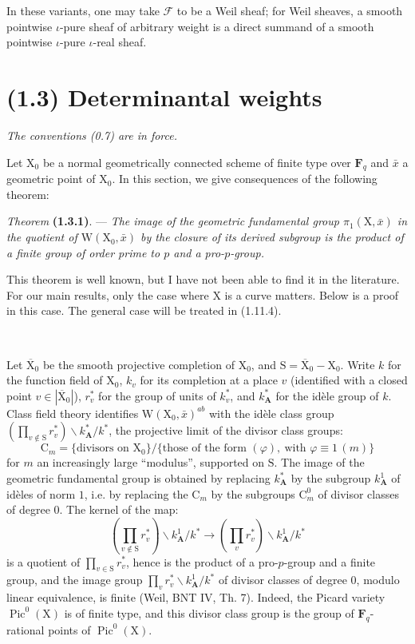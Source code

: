 \documentclass[11pt,leqno]{article}
\newcommand{\Page}[1]{\ifvmode\noindent\else\unskip\ \fi{\footnotesize\textcolor{gray}{[p.\,#1]}}\ \ignorespaces}
\begin{document}
In these variants, one may take \(\mathscr{F}\) to be a Weil sheaf; for Weil sheaves, a smooth pointwise \(\iota\)-pure sheaf of arbitrary weight is a direct summand of a smooth pointwise \(\iota\)-pure \(\iota\)-real sheaf.

\section*{(1.3) Determinantal weights}

\textit{The conventions \textup{(0.7)} are in force.}

Let \(\mathrm{X}_0\) be a normal geometrically connected scheme of finite type over \(\mathbf{F}_q\) and \(\bar{x}\) a geometric point of \(\mathrm{X}_0\). In this section, we give consequences of the following theorem:

\textit{Theorem} \textbf{(1.3.1)}. — \textit{The image of the geometric fundamental group \(\pi_1(\mathrm{X},\bar{x})\) in the quotient of \(\mathrm{W}(\mathrm{X}_0,\bar{x})\) by the closure of its derived subgroup is the product of a finite group of order prime to \(p\) and a pro-\(p\)-group.}

This theorem is well known, but I have not been able to find it in the literature. For our main results, only the case where \(\mathrm{X}\) is a curve matters. Below is a proof in this case. The general case will be treated in (1.11.4).

\Page{157}

Let \(\overline{\mathrm{X}}_0\) be the smooth projective completion of \(\mathrm{X}_0\), and \(\mathrm{S}=\overline{\mathrm{X}}_0-\mathrm{X}_0\). Write \(k\) for the function field of \(\mathrm{X}_0\), \(k_v\) for its completion at a place \(v\) (identified with a closed point \(v\in|\overline{\mathrm{X}}_0|\)), \(r_v^*\)  for the group of units of \(k_v^*\), and \(k_{\mathbf{A}}^*\) for the idèle group of \(k\). Class field theory identifies \(\mathrm{W}(\mathrm{X}_0,\bar{x})^{ab}\) with the idèle class group \((\prod\limits_{v\notin\mathrm{S}}r_v^*)\backslash k_{\mathbf{A}}^*/k^*\), the projective limit of the divisor class groups:
\[
\mathrm{C}_m
=\{\text{divisors on }\mathrm{X}_0\}/
 \{\text{those of the form }(\varphi),\ \text{with }\varphi\equiv1\,(m)\}
\]
for \(m\) an increasingly large “modulus”, supported on \(\mathrm{S}\). The image of the geometric fundamental group is obtained by replacing \(k_{\mathbf{A}}^*\) by the subgroup \(k_{\mathbf{A}}^1\) of idèles of norm \(1\), i.e. by replacing the \(\mathrm{C}_m\) by the subgroups \(\mathrm{C}_m^0\) of divisor classes of degree \(0\). The kernel of the map:
\[
(\prod_{v\notin\mathrm{S}}r_v^*)\backslash k_{\mathbf{A}}^1/k^*
\longrightarrow
(\prod_v r_v^*)\backslash k_{\mathbf{A}}^1/k^*
\]
is a quotient of \(\prod\limits_{v\in\mathrm{S}}r_v^*\), hence is the product of a pro-\(p\)-group and a finite group, and the image group \(\prod\limits_v r_v^*\backslash k_{\mathbf{A}}^1/k^*\) of divisor classes of degree \(0\), modulo linear equivalence, is finite (Weil, BNT IV, Th. 7). Indeed, the Picard variety \(\operatorname{Pic}^0(\mathrm{X})\) is of finite type, and this divisor class group is the group of \(\mathbf{F}_q\)-rational points of \(\operatorname{Pic}^0(\mathrm{X})\).
\end{document}
